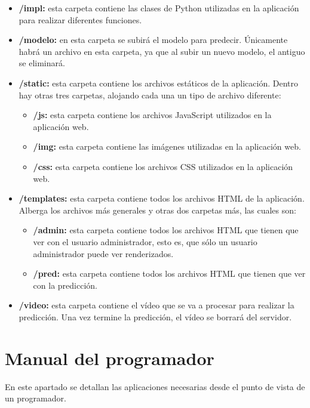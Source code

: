 \begin{itemize}
	\item \textbf{/impl:} esta carpeta contiene las clases de Python utilizadas en la aplicación para realizar diferentes funciones.
	\item \textbf{/modelo:} en esta carpeta se subirá el modelo para predecir. Únicamente habrá un archivo en esta carpeta, ya que al subir un nuevo modelo, el antiguo se eliminará.
	\item \textbf{/static:} esta carpeta contiene los archivos estáticos de la aplicación. Dentro hay otras tres carpetas, alojando cada una un tipo de archivo diferente:
	\begin{itemize}
		\item \textbf{/js:} esta carpeta contiene los archivos JavaScript utilizados en la aplicación web.
		\item \textbf{/img:} esta carpeta contiene las imágenes utilizadas en la aplicación web.
		\item \textbf{/css:} esta carpeta contiene los archivos CSS utilizados en la aplicación web.
	\end{itemize}
	\item \textbf{/templates:} esta carpeta contiene todos los archivos HTML de la aplicación. Alberga los archivos más generales y otras dos carpetas más, las cuales son:
	\begin{itemize}
		\item \textbf{/admin:} esta carpeta contiene todos los archivos HTML que tienen que ver con el usuario administrador, esto es, que sólo un usuario administrador puede ver renderizados.
		\item \textbf{/pred:} esta carpeta contiene todos los archivos HTML que tienen que ver con la predicción.
	\end{itemize}
	\item \textbf{/video:} esta carpeta contiene el vídeo que se va a procesar para realizar la predicción. Una vez termine la predicción, el vídeo se borrará del servidor.
\end{itemize}

\section{Manual del programador}
En este apartado se detallan las aplicaciones necesarias desde el punto de vista de un programador.

